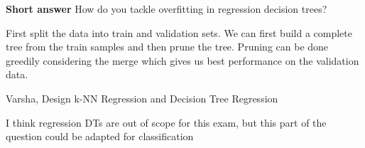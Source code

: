 \begin{parts}
\begin{subparts}
    
    \subpart[2] \textbf{Short answer} How do you tackle overfitting in regression decision trees?
    \fillwithlines{2em}
    \begin{soln}
    First split the data into train and validation sets. We can first build a complete tree from the train samples and then prune the tree. Pruning can be done greedily considering the merge which gives us best performance on the validation data.
    \end{soln}
    \begin{qauthor}
        Varsha, Design k-NN Regression and Decision Tree Regression
    \end{qauthor}
    \begin{qtester}
   I think regression DTs are out of scope for this exam, but this part of the question could be adapted for classification
    \end{qtester}
\end{subparts}
\end{parts}

